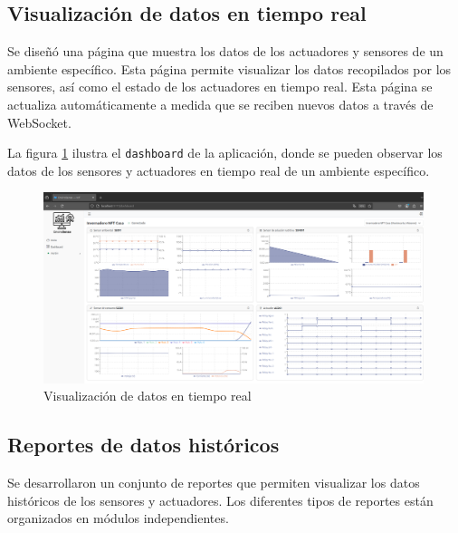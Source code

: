 \subsection{Visualización de datos en tiempo real}


Se diseñó una página que muestra los datos de los actuadores y sensores de un
ambiente específico. Esta página permite visualizar los datos recopilados por
los sensores, así como el estado de los actuadores en tiempo real. Esta página
se actualiza automáticamente a medida que se reciben nuevos datos a través de
WebSocket.

La figura \ref{fig:dashboard} ilustra el \texttt{dashboard} de la aplicación,
donde se pueden observar los datos de los sensores y actuadores en tiempo real
de un ambiente específico.

\begin{figure}[H]
    \centering
    \includegraphics[width=0.99\textwidth]{./Images/27_dashboard.png}
    \caption{Visualización de datos en tiempo real}
    \label{fig:dashboard}
\end{figure}

\subsection{Reportes de datos históricos}

Se desarrollaron un conjunto de reportes que permiten visualizar los datos
históricos de los sensores y actuadores. %
Los diferentes tipos de reportes están organizados en módulos independientes.

